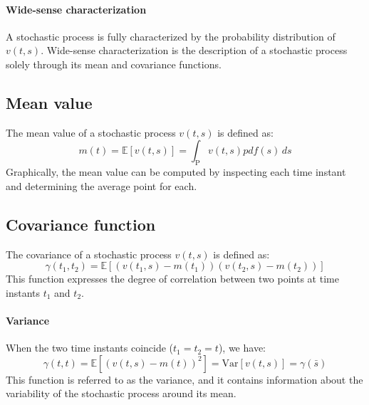 \paragraph*{Wide-sense characterization}
A stochastic process is fully characterized by the probability distribution of $v(t,s)$.
 Wide-sense characterization is the description of a stochastic process solely through its mean and covariance functions.

\subsection{Mean value}
The mean value of a stochastic process $v(t,s)$ is defined as:
\[m(t)=\mathbb{E}\left[ v(t,s) \right]=\int_{\text{P}}v(t,s)pdf(s)\,ds\]
Graphically, the mean value can be computed by inspecting each time instant and determining the average point for each.

\subsection{Covariance function}
The covariance of a stochastic process $v(t,s)$ is defined as:
\[\gamma(t_1,t_2)=\mathbb{E}\left[ \left(v(t_1,s)-m(t_1)\right)\left(v(t_2,s)-m(t_2)\right) \right]\]
This function expresses the degree of correlation between two points at time instants $t_1$ and $t_2$.

\paragraph*{Variance}
When the two time instants coincide ($t_1=t_2=t$), we have:
\[\gamma(t,t)=\mathbb{E}\left[ {\left(v(t,s)-m(t)\right)}^2 \right] =\text{Var}\left[v(t,s)\right]=\gamma(\bar{s})\]
This function is referred to as the variance, and it contains information about the variability of the stochastic process around its mean.